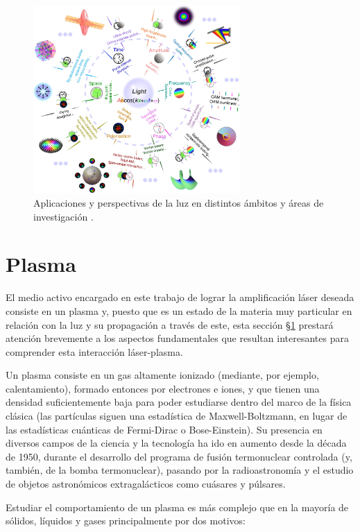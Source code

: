 \begin{figure}[htbp]
  \centering
  \includegraphics[width=0.7\textwidth]{Figuras/ch1_app_oam.png}
  \caption{Aplicaciones y perspectivas de la luz en distintos ámbitos y áreas de investigación \autocite{He2022}.}
  \label{fig:1.16}
\end{figure}

\section{Plasma}\label{sec:1.2}
El medio activo encargado en este trabajo de lograr la amplificación láser deseada consiste en un plasma y, puesto que es un estado de la materia muy particular en relación con la luz y su propagación a través de este, esta sección \S\ref{sec:1.2} prestará atención brevemente a los aspectos fundamentales que resultan interesantes para comprender esta interacción láser-plasma. 

Un plasma consiste en un gas altamente ionizado (mediante, por ejemplo, calentamiento), formado entonces por electrones e iones, y que tienen una densidad suficientemente baja para poder estudiarse dentro del marco de la física clásica (las partículas siguen una estadística de Maxwell-Boltzmann, en lugar de las estadísticas cuánticas de Fermi-Dirac o Bose-Einstein)\autocite{Thorne2017}. Su presencia en diversos campos de la ciencia y la tecnología ha ido en aumento desde la década de 1950, durante el desarrollo del programa de fusión termonuclear controlada (y, también, de la bomba termonuclear), pasando por la radioastronomía y el estudio de objetos astronómicos extragalácticos como cuásares y púlsares.

Estudiar el comportamiento de un plasma es más complejo que en la mayoría de sólidos, líquidos y gases principalmente por dos motivos:

